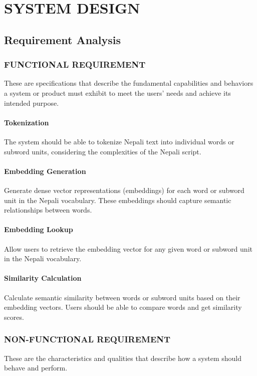 \chapter{SYSTEM DESIGN}
\section{Requirement Analysis}
        \subsection{FUNCTIONAL REQUIREMENT}
            These are specifications that describe the fundamental capabilities and behaviors a system or product must exhibit to meet the users' needs and achieve its intended purpose. 

            \subsubsection{Tokenization}
            The system should be able to tokenize Nepali text into individual words or subword units, considering the complexities of the Nepali script.

            \subsubsection{Embedding Generation}
            Generate dense vector representations (embeddings) for each word or subword unit in the Nepali vocabulary. These embeddings should capture semantic relationships between words.

            \subsubsection{Embedding Lookup}
            Allow users to retrieve the embedding vector for any given word or subword unit in the Nepali vocabulary.

            \subsubsection{Similarity Calculation}
            Calculate semantic similarity between words or subword units based on their embedding vectors. Users should be able to compare words and get similarity scores.

        \subsection{NON-FUNCTIONAL REQUIREMENT}
            These are the characteristics and qualities that describe how a system should behave and perform.

